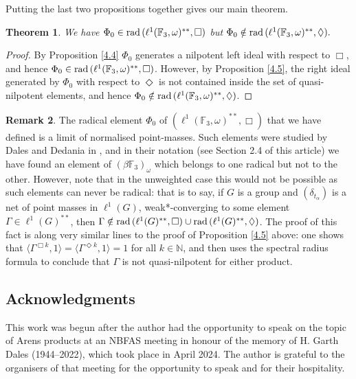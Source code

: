 \documentclass[twoside,11pt]{amsart}
\numberwithin{equation}{section}
\newtheorem{theorem}{Theorem}[section]
\theoremstyle{definition}
\newtheorem{remark}[theorem]{Remark}
\newcommand {\N}{\mathbb N}
\newcommand{\rad}{{\rm rad\,}}
\newcommand{\1}{\mathbbm{1}}
\newcommand{\F}{\mathbb F}
\begin{document}
	Putting the last two propositions together gives our main theorem.
	
	\begin{theorem}		\label{4.6}
		We have $\Phi_0 \in \rad(\ell^1(\F_3, \omega)^{**}, \Box)$ but $\Phi_0 \notin \rad(\ell^1(\F_3, \omega)^{**}, \Diamond).$
	\end{theorem}
	
	\begin{proof}
		By Proposition \ref{4.4} $\Phi_0$ generates a nilpotent left ideal with respect to $\Box$, and hence $\Phi_0 \in \rad(\ell^1(\F_3, \omega)^{**}, \Box)$. However, by Proposition \ref{4.5}, the right ideal generated by $\Phi_0$ with respect to $\Diamond$ is not contained inside the set of quasi-nilpotent elements, and hence $\Phi_0 \notin \rad(\ell^1(\F_3, \omega)^{**}, \Diamond)$.
	\end{proof}
	
	\vskip 2mm
	\begin{remark} 	\label{DDRemark}
	The radical element $\Phi_0$ of $(\ell^1(\F_3, \omega)^{**}, \Box)$ that we have defined is a limit of normalised point-masses. Such elements were studied by Dales and Dedania in \cite{DD}, and in their notation (see Section 2.4 of this article) we have found an element of $(\beta \F_3)_\omega$ which belongs to one radical but not to the other. 
	However, note that in the unweighted case this would not be possible as such elements can never be radical: that is to say, if $G$ is a group and $(\delta_{t_\alpha})$ is a net of point masses in $\ell^1(G)$, weak*-converging to some element $\Gamma \in \ell^1(G)^{**}$, then $\Gamma \notin \rad(\ell^1(G)^{**}, \Box) \cup \rad(\ell^1(G)^{**}, \Diamond)$.
	The proof of this fact is along very similar lines to the proof of Proposition \ref{4.5} above: one shows that $\langle \Gamma^{\Box k}, 1 \rangle = \langle \Gamma^{\Diamond k}, 1 \rangle  = 1$ for all $k\in \N$, and then uses the spectral radius formula to conclude that $\Gamma$ is not quasi-nilpotent for either product.
\end{remark}
	
	
	
	
	\subsection*{Acknowledgments}
	This work was begun after the author had the opportunity to speak on the topic of Arens products at an NBFAS meeting in honour of the memory of H. Garth Dales (1944--2022), which took place in April 2024. The author is grateful to the organisers of that meeting for the opportunity to speak and for their hospitality.
	
\end{document}
